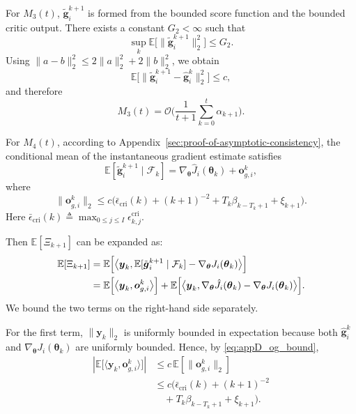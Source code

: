 \documentclass{IEEEtran}
\begin{document}
For $M_3(t)$, $\tilde{\boldsymbol{g}}_i^{k+1}$ is formed from the bounded score function and the bounded critic output. There exists a constant $G_2<\infty$ such that
\begin{equation}
\sup_k\mathbb{E}\big[\|\tilde{\boldsymbol{g}}_i^{k+1}\|_2^2\big]\le G_2.
\end{equation}
Using $\|a-b\|_2^2\le 2\|a\|_2^2+2\|b\|_2^2$, we obtain
\begin{equation}
\mathbb{E}\Big[\big\|\tilde{\boldsymbol{g}}_i^{k+1}-\hat{\boldsymbol{g}}_i^k\big\|_2^2\Big]\le c,
\end{equation}
and therefore
\begin{equation}
M_3(t)=\mathcal{O}\!\Bigg(\frac{1}{t+1}\sum_{k=0}^{t}\alpha_{k+1}\Bigg).
\label{eq:appD_M3_bound}
\end{equation}

For $M_4(t)$, according to Appendix~\ref{sec:proof-of-asymptotic-consistency}, the conditional mean of the instantaneous gradient estimate satisfies
\begin{equation}
\mathbb{E}[\tilde{\boldsymbol{g}}_i^{k+1}\mid \mathcal{F}_k]
=\nabla_{\boldsymbol{\theta}}\hat{J}_i(\boldsymbol{\theta}_k)+\boldsymbol{o}_{g,i}^k,
\label{eq:appD_conditional_mean}
\end{equation}
where
\begin{equation}
\|\boldsymbol{o}_{g,i}^k\|_2
\le c\Big(\bar{\epsilon}_{\mathrm{cri}}(k)+(k+1)^{-2}+T_k\beta_{k-T_k+1}+\xi_{k+1}\Big).
\label{eq:appD_og_bound}
\end{equation}
Here $\bar{\epsilon}_{\mathrm{cri}}(k)\triangleq \max_{0\le j\le I}\epsilon_{k,j}^{\mathrm{cri}}$.

Then $\mathbb{E}[\Xi_{k+1}]$ can be expanded as: 
\begin{align}
\mathbb{E}[\Xi_{k+1}]
&=\mathbb{E}\Big[\big\langle \boldsymbol{y}_k,\mathbb{E}[\tilde{\boldsymbol{g}}_i^{k+1}\mid \mathcal{F}_k]-\nabla_{\boldsymbol{\theta}}J_i(\boldsymbol{\theta}_k)\big\rangle\Big] \notag\\
&=\mathbb{E}\Big[\big\langle \boldsymbol{y}_k,\boldsymbol{o}_{g,i}^k\big\rangle\Big]
+\mathbb{E}\Big[\big\langle \boldsymbol{y}_k,\nabla_{\boldsymbol{\theta}}\hat{J}_i(\boldsymbol{\theta}_k)-\nabla_{\boldsymbol{\theta}}J_i(\boldsymbol{\theta}_k)\big\rangle\Big].
\label{eq:appD_Xi_expand}
\end{align}
We bound the two terms on the right-hand side separately.

For the first term, $\|\boldsymbol{y}_k\|_2$ is uniformly bounded in expectation because both $\hat{\boldsymbol{g}}_i^k$ and $\nabla_{\boldsymbol{\theta}}J_i(\boldsymbol{\theta}_k)$ are uniformly bounded. Hence, by \eqref{eq:appD_og_bound},
\begin{equation}
\begin{aligned}
\left|\mathbb{E}\Big[\big\langle \boldsymbol{y}_k,\boldsymbol{o}_{g,i}^k\big\rangle\Big]\right|
&\le c\,\mathbb{E}[\|\boldsymbol{o}_{g,i}^k\|_2]\\
&\le c\Big(\bar{\epsilon}_{\mathrm{cri}}(k)+(k+1)^{-2}\\
&\quad+T_k\beta_{k-T_k+1}+\xi_{k+1}\Big).
\end{aligned}
\label{eq:appD_Xi_first}
\end{equation}
\end{document}
